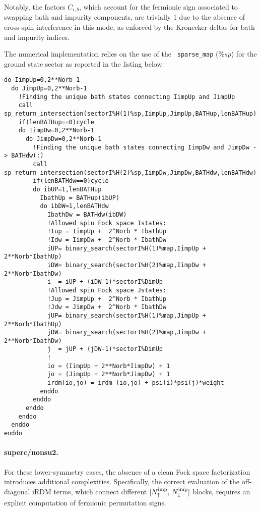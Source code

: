 \documentclass[edipack_sp.tex]{subfiles}
\begin{document}
Notably, the factors $C_{i,b}$, which account for the 
fermionic sign associated to swapping bath and impurity components, are 
trivially 1 due to the absence of cross-spin interference in this 
mode, as enforced by the Kronecker deltas for bath and impurity 
indices.

The numerical implementation relies on the use of the {\tt
  sparse\_map} ($\%sp$) for the ground state sector as reported in the listing below:  
\begin{lstlisting}[style=fstyle,numbers=none,basicstyle={\scriptsize\ttfamily}]
do IimpUp=0,2**Norb-1
  do JimpUp=0,2**Norb-1
    !Finding the unique bath states connecting IimpUp and JimpUp
    call sp_return_intersection(sectorI%H(1)%sp,IimpUp,JimpUp,BATHup,lenBATHup)
    if(lenBATHup==0)cycle
    do IimpDw=0,2**Norb-1
      do JimpDw=0,2**Norb-1
        !Finding the unique bath states connecting IimpDw and JimpDw -> BATHdw(:)
        call sp_return_intersection(sectorI%H(2)%sp,IimpDw,JimpDw,BATHdw,lenBATHdw)
        if(lenBATHdw==0)cycle
        do ibUP=1,lenBATHup
          IbathUp = BATHup(ibUP)
          do ibDW=1,lenBATHdw
            IbathDw = BATHdw(ibDW)
            !Allowed spin Fock space Istates:
            !Iup = IimpUp +  2^Norb * IbathUp
            !Idw = IimpDw +  2^Norb * IbathDw
            iUP= binary_search(sectorI%H(1)%map,IimpUp + 2**Norb*IbathUp)
            iDW= binary_search(sectorI%H(2)%map,IimpDw + 2**Norb*IbathDw)
            i  = iUP + (iDW-1)*sectorI%DimUp
            !Allowed spin Fock space Jstates:
            !Jup = JimpUp +  2^Norb * IbathUp
            !Jdw = JimpDw +  2^Norb * IbathDw
            jUP= binary_search(sectorI%H(1)%map,JimpUp + 2**Norb*IbathUp)
            jDW= binary_search(sectorI%H(2)%map,JimpDw + 2**Norb*IbathDw)
            j  = jUP + (jDW-1)*sectorI%DimUp
            ! 
            io = (IimpUp + 2**Norb*IimpDw) + 1
            jo = (JimpUp + 2**Norb*JimpDw) + 1
            irdm(io,jo) = irdm (io,jo) + psi(i)*psi(j)*weight
          enddo
        enddo
      enddo
    enddo
  enddo
enddo
\end{lstlisting}



\paragraph{{\bf superc/nonsu2}.}
For these lower-symmetry cases, the absence of a clean Fock space 
factorization introduces additional complexities. Specifically, the 
correct evaluation of the off-diagonal iRDM terms, which connect 
different $[N^\mathrm{imp}_\uparrow,\,N^\mathrm{imp}_\downarrow]$ blocks, 
requires an explicit computation of fermionic permutation signs.
\end{document}
